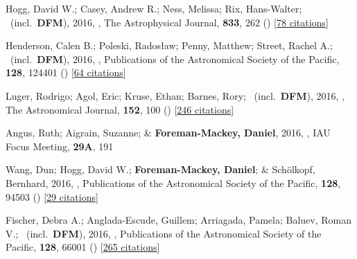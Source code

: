 \item[{\color{numcolor}\scriptsize23}] Hogg, David W.; Casey, Andrew R.; Ness, Melissa; Rix, Hans-Walter; \etal\ (incl.\ \textbf{DFM}), 2016, , The Astrophysical Journal, \textbf{833}, 262 () [\href{https://ui.adsabs.harvard.edu/abs/2016ApJ...833..262H}{78 citations}]

\item[{\color{numcolor}\scriptsize22}] Henderson, Calen B.; Poleski, Rados{\l}aw; Penny, Matthew; Street, Rachel A.; \etal\ (incl.\ \textbf{DFM}), 2016, , Publications of the Astronomical Society of the Pacific, \textbf{128}, 124401 () [\href{https://ui.adsabs.harvard.edu/abs/2016PASP..128l4401H}{64 citations}]

\item[{\color{numcolor}\scriptsize21}] Luger, Rodrigo; Agol, Eric; Kruse, Ethan; Barnes, Rory; \etal\ (incl.\ \textbf{DFM}), 2016, , The Astronomical Journal, \textbf{152}, 100 () [\href{https://ui.adsabs.harvard.edu/abs/2016AJ....152..100L}{246 citations}]

\item[{\color{numcolor}\scriptsize20}] Angus, Ruth; Aigrain, Suzanne; \& \textbf{Foreman-Mackey, Daniel}, 2016, , IAU Focus Meeting, \textbf{29A}, 191

\item[{\color{numcolor}\scriptsize19}] Wang, Dun; Hogg, David W.; \textbf{Foreman-Mackey, Daniel}; \& Sch{\"o}lkopf, Bernhard, 2016, , Publications of the Astronomical Society of the Pacific, \textbf{128}, 94503 () [\href{https://ui.adsabs.harvard.edu/abs/2016PASP..128i4503W}{29 citations}]

\item[{\color{numcolor}\scriptsize18}] Fischer, Debra A.; Anglada-Escude, Guillem; Arriagada, Pamela; Baluev, Roman V.; \etal\ (incl.\ \textbf{DFM}), 2016, , Publications of the Astronomical Society of the Pacific, \textbf{128}, 66001 () [\href{https://ui.adsabs.harvard.edu/abs/2016PASP..128f6001F}{265 citations}]

